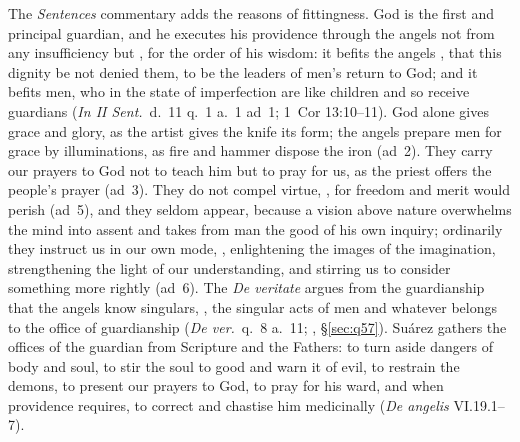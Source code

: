 The \emph{Sentences} commentary adds the reasons of fittingness. God is the
first and principal guardian, and he executes his providence through the
angels not from any insufficiency but , for the order of his wisdom: it befits the angels
, that this dignity be not denied them, to be the
leaders of men's return to God; and it befits men, who in the state of
imperfection are like children and so receive guardians  (\emph{In II Sent.}\ d.~11 q.~1 a.~1 ad~1; 1~Cor 13:10--11). God
alone gives grace and glory, as the artist gives the knife its form; the
angels prepare men for grace by illuminations, as fire and hammer dispose the
iron (ad~2). They carry our prayers to God
not to teach him but to pray for us, as the priest offers the people's
prayer (ad~3). They do not compel virtue, , for freedom and merit would perish (ad~5), and
they seldom appear, because a vision above nature overwhelms the mind into
assent and takes from man the good of his own inquiry; ordinarily they
instruct us in our own mode, ,
enlightening the images of the imagination, strengthening the light of our
understanding, and stirring us to consider something more rightly (ad~6).
The \emph{De veritate} argues from the guardianship that the angels know
singulars, , the singular acts of men and whatever belongs to the
office of guardianship (\emph{De ver.}\ q.~8 a.~11; ,
\S\ref{sec:q57}). Suárez gathers the offices of the
guardian from Scripture and the Fathers: to turn aside dangers of body and
soul, to stir the soul to good and warn it of evil, to restrain the demons,
to present our prayers to God, to pray for his ward, and when providence
requires, to correct and chastise him medicinally (\emph{De angelis}
VI.19.1--7).

